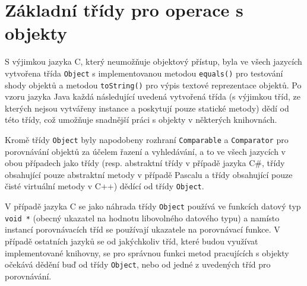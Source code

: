 \documentclass[onepage, a4paper, 12pt]{bakalarka}
\begin{document}
\section{Základní třídy pro operace s objekty}
S výjimkou jazyka C, který neumožňuje objektový přístup, byla ve všech jazycích vytvořena třída \texttt{Object} s implementovanou metodou \texttt{equals()} pro testování shody objektů a metodou \texttt{toString()} pro výpis textové reprezentace objektů. Po vzoru jazyka Java každá následující uvedená vytvořená třída (s výjimkou tříd, ze kterých nejsou vytvářeny instance a poskytují pouze statické metody) dědí od této třídy, což umožňuje snadnější práci s objekty v některých knihovnách.\par
Kromě třídy \texttt{Object} byly napodobeny rozhraní \texttt{Comparable} a \texttt{Comparator} pro porovnávání objektů za účelem řazení a vyhledávání, a to ve všech jazycích v obou případech jako třídy (resp. abstraktní třídy v případě jazyka C\#, třídy obsahující pouze abstraktní metody v případě Pascalu a třídy obsahující pouze čisté virtuální metody v C++) dědící od třídy \texttt{Object}.\par
V případě jazyka C se jako náhrada třídy \texttt{Object} používá ve funkcích datový typ \texttt{void *} (obecný ukazatel na hodnotu libovolného datového typu) a namísto instancí porovnávacích tříd se používají ukazatele na porovnávací funkce. V případě ostatních jazyků se od jakýchkoliv tříd, které budou využívat implementované knihovny, se pro správnou funkci metod pracujících s objekty očekává dědění buď od třídy \texttt{Object}, nebo od jedné z uvedených tříd pro porovnávání.
\end{document}
